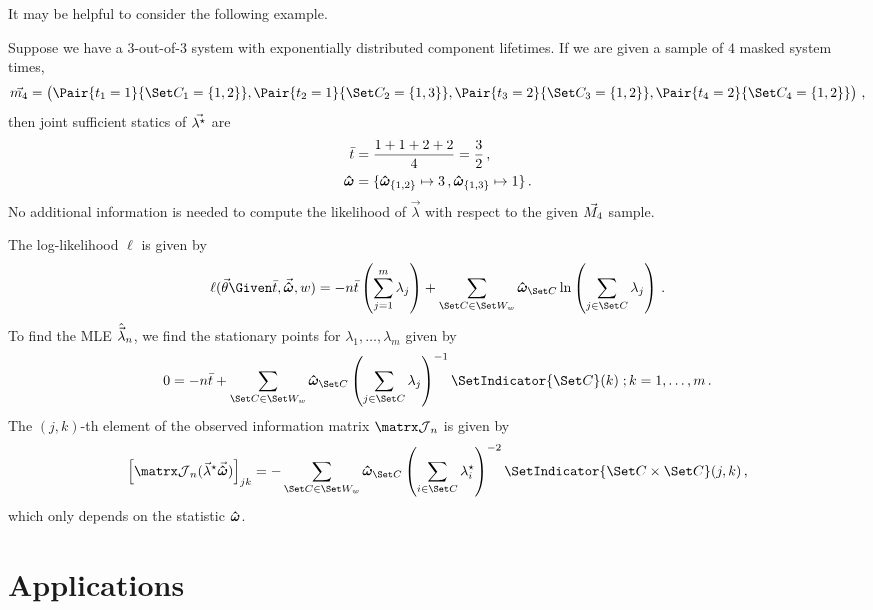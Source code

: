 \documentclass[../main.tex]{subfiles}
\begin{document}
It may be helpful to consider the following example.
\begin{example}
Suppose we have a $3$-out-of-$3$ system with exponentially distributed component lifetimes.
If we are given a sample of $4$ masked system times,
\begin{equation}
    \mfsoi{4} = \left(
        \Pair{t_1 = 1}{\cand_1 = \{ 1, 2 \}},
        \Pair{t_2 = 1}{\cand_2 = \{ 1, 3 \}},
        \Pair{t_3 = 2}{\cand_3 = \{ 1, 2 \}},
        \Pair{t_4 = 2}{\cand_4 = \{ 1, 2 \}}
    \right)\,,
\end{equation}
then joint sufficient statics of $\vec{{\lambda}^{\star}}$ are
\begin{align*}
    \bar t &= \frac{1 + 1 + 2 + 2}{4} = \frac{3}{2}\,,\\
    \boldsymbol{\hat\omega} &= \{\boldsymbol{\hat\omega}_{\{1,2\}} \mapsto 3\,,\boldsymbol{\hat\omega}_{\{1,3\}} \mapsto 1\}\,.
\end{align*}
No additional information is needed to compute the likelihood of $\vec\lambda$ with respect to the given $\vec{M_{4}}$ sample.
\end{example}

The log-likelihood $\ell$ is given by
\begin{equation}
\ell(\sysparamvec \Given \bar t, \vec\cntsymb, w) =
    -n \bar t \left ( \sum_{j=1}^{m} \lambda_j \right ) +
    \sum_{\cand \in \candsw{w}} \cntsymb_{\cand} \ln
        \left ( \sum_{j \in \cand} \lambda_j \right )\,.
\end{equation}
To find the MLE $\hat{\vec\lambda}_n$, we find the stationary points for $\lambda_1, \ldots, \lambda_m$ given by
\begin{equation}
    0   =  -n \bar t +
            \sum_{\cand \in \candsw{w}} \cntsymb_{\cand}
                \left (
                    \sum_{j \in \cand} \lambda_j
                \right )^{-1} \SetIndicator{\cand}(k)\;; k = 1, \ldots, m\,.
\end{equation}
The $(j, k)$-th element of the observed information matrix $\observed_n$ is given by
\begin{equation}
    \left [ \observed_n(\tparam{\vec\lambda} \vec\cntsymb) \right ]_{j k} =
        - \sum_{\cand \in \candsw{w}} \cntsymb_{\cand} \left( \sum_{i \in \cand} \tparam\lambda_i \right)^{-2} \SetIndicator{\cand \times \cand}(j,k)\,,
\end{equation}
which only depends on the statistic $\boldsymbol{\hat\omega}$.

\section{Applications}
\end{document}
